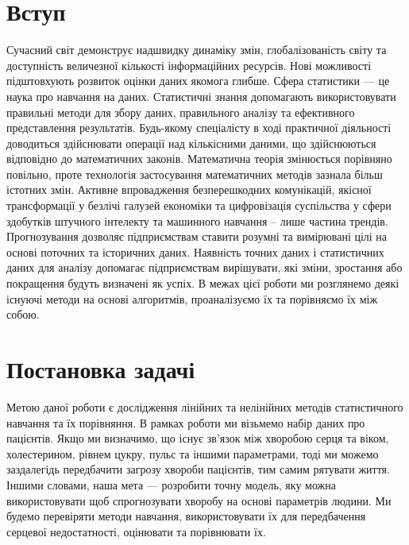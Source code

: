 \documentclass[14pt,a4paper]{extarticle}
\newcounter{e}
\numberwithin{equation}{section}
\numberwithin{figure}{section}
\begin{document}
	\section*{Вступ}
	\begin{center}\end{center}
	Сучасний світ демонструє надшвидку динаміку змін, глобалізованість світу та доступність величезної кількості інформаційних ресурсів. Нові можливості підштовхують розвиток оцінки даних якомога глибше. Сфера статистики — це наука про навчання на даних. Статистичні знання допомагають використовувати правильні методи для збору даних, правильного аналізу та ефективного представлення результатів. Будь-якому спеціалісту в ході практичної діяльності доводиться здійснювати операції над кількісними даними, що здійснюються відповідно до математичних законів. Математична теорія змінюється порівняно повільно, проте технологія застосування математичних методів зазнала більш істотних змін. Активне впровадження безперешкодних комунікацій, якісної трансформації у безлічі галузей економіки та цифровізація суспільства у сфери здобутків штучного інтелекту та машинного навчання – лише частина трендів. Прогнозування дозволяє підприємствам ставити розумні та вимірювані цілі на основі поточних та історичних даних. Наявність точних даних і статистичних даних для аналізу допомагає підприємствам вирішувати, які зміни, зростання або покращення будуть визначені як успіх. В межах цієї роботи ми розглянемо деякі існуючі методи на основі алгоритмів, проаналізуємо їх та порівняємо їх між собою.	
	
	\newpage
	\thispagestyle{empty}
	\section{Постановка задачі}	
	\begin{center}\end{center}
	
	Метою даної роботи є дослідження лінійних та нелінійних методів статистичного навчання та їх порівняння. В рамках роботи ми візьмемо набір даних про пацієнтів. Якщо ми визначимо, що існує зв’язок між хворобою серця та віком, холестерином, рівнем цукру, пульс та іншими параметрами, тоді ми можемо заздалегідь передбачити загрозу хвороби пацієнтів, тим самим рятувати життя. Іншими словами, наша мета — розробити точну модель, яку можна використовувати щоб спрогнозувати хворобу на основі параметрів людини. Ми будемо перевіряти методи навчання, використовувати їх для передбачення серцевої недостатності, оцінювати та порівнювати їх.
\end{document}
